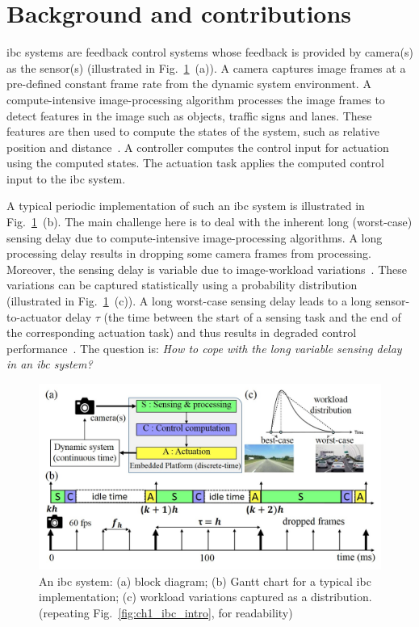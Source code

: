 \section{Background and contributions}
\Gls{ibc} systems are feedback control systems whose feedback is provided by camera(s) as the sensor(s) (illustrated in Fig.~\ref{fig:ch7_ibc_intro}~(a)).
A camera captures image frames at a pre-defined constant frame rate from the dynamic system environment.
A compute-intensive image-processing algorithm processes the image frames to detect features in the image such as objects, traffic signs and lanes.
These features are then used to compute the states of the system, such as relative position and distance~\cite{corke2017robotics}.
A controller computes the control input for actuation using the computed states.
The actuation task applies the computed control input to the \gls{ibc} system.

A typical periodic implementation of such an \gls{ibc} system is illustrated in Fig.~\ref{fig:ch7_ibc_intro}~(b).
The main challenge here is to deal with the inherent long (worst-case) sensing delay due to compute-intensive image-processing algorithms.
A long processing delay results in dropping some camera frames from processing. 
Moreover, the sensing delay is variable due to image-workload variations~\cite{mohamed2019designing}. These variations can be captured statistically using a probability distribution~\cite{adyanthaya2014robustness} (illustrated in Fig.~\ref{fig:ch7_ibc_intro}~(c)).
A long worst-case sensing delay leads to a long sensor-to-actuator delay $\tau$ (the time between the start of a sensing task and the end of the corresponding actuation task) and thus results in degraded control performance~\cite{sharkey1996delays,aastrom2013computer}.
The question is: \textit{How to cope with the long variable sensing delay in an \gls{ibc} system?}

\begin{figure}[t]
\centerline{\includegraphics[width=\textwidth]{images/ibc_intro.jpg}}
\vspace{-1ex}
\caption{An \gls{ibc} system: (a) block diagram; (b) Gantt chart for a typical \gls{ibc} implementation; (c) workload variations captured as a distribution. (repeating Fig.~\ref{fig:ch1_ibc_intro}, for readability)}
\label{fig:ch7_ibc_intro}
\end{figure}

